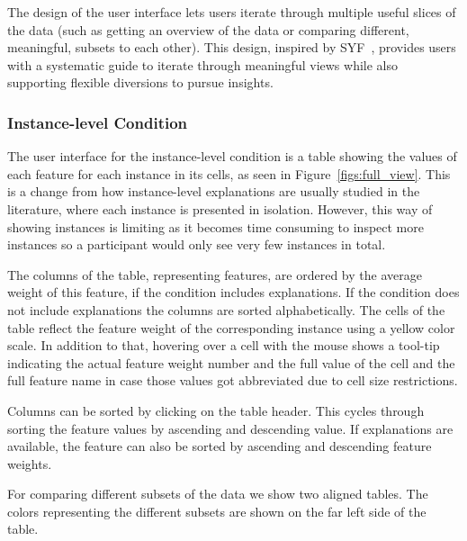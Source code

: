 The design of the user interface lets users iterate through multiple useful slices of the data (such as getting an overview of the data or comparing different, meaningful, subsets to each other).
This design, inspired by SYF~\cite{perer2008systematic}, provides users with a systematic guide to iterate through meaningful views while also supporting flexible diversions to pursue insights.

\subsubsection{Instance-level Condition}
The user interface for the instance-level condition is a table showing the values of each feature for each instance in its cells, as seen in Figure~\ref{figs:full_view}.
This is a change from how instance-level explanations are usually studied in the literature, where each instance is presented in isolation.
However, this way of showing instances is limiting as it becomes time consuming to inspect more instances so a participant would only see very few instances in total.

The columns of the table, representing features, are ordered by the average weight of this feature, if the condition includes explanations.
If the condition does not include explanations the columns are sorted alphabetically.
The cells of the table reflect the feature weight of the corresponding instance using a yellow color scale.
In addition to that, hovering over a cell with the mouse shows a tool-tip indicating the actual feature weight number and the full value of the cell and the full feature name in case those values got abbreviated due to cell size restrictions.

Columns can be sorted by clicking on the table header.
This cycles through sorting the feature values by ascending and descending value.
If explanations are available, the feature can also be sorted by ascending and descending feature weights.

For comparing different subsets of the data we show two aligned tables.
The colors representing the different subsets are shown on the far left side of the table.

